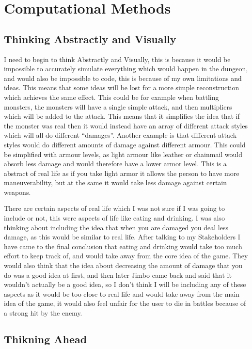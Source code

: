 \documentclass[14pt]{article}
\begin{document}
	\section{Computational Methods}

		\subsection{Thinking Abstractly and Visually}
I need to begin to think Abstractly and Visually, this is because it would be impossible to accurately simulate everything which would happen in the dungeon, and would also be impossible to code, this is because of my own limitations and ideas. This means that some ideas will be lost for a more simple reconstruction which achieves the same effect. This could be for example when battling monsters, the monsters will have a single simple attack, and then multipliers which will be added to the attack. This means that it simplifies the idea that if the monster was real then it would instead have an array of different attack styles which will all do different “damages”. Another example is that different attack styles would do different amounts of damage against different armour. This could be simplified with armour levels, as light armour like leather or chainmail would absorb less damage and would therefore have a lower armor level. This is a abstract of real life as if you take light armor it allows the person to have more maneuverability, but at the same it would take less damage against certain weapons. 

There are certain aspects of real life which I was not sure if I was going to include or not, this were aspects of life like eating and drinking. I was also thinking about including the idea that when you are damaged you deal less damage, as this would be similar to real life. After talking to my Stakeholders I have came to the final conclusion that eating and drinking would take too much effort to keep track of, and would take away from the core idea of the game. They would also think that the idea about decreasing the amount of damage that you do was a good idea at first, and then later Jimbo came back and said that it wouldn't actually be a good idea, so I don't think I will be including any of these aspects as it would be too close to real life and would take away from the main idea of the game, it would also feel unfair for the user to die in battles because of a strong hit by the enemy. 

	
		\subsection{Thikning Ahead}
	
\end{document}
